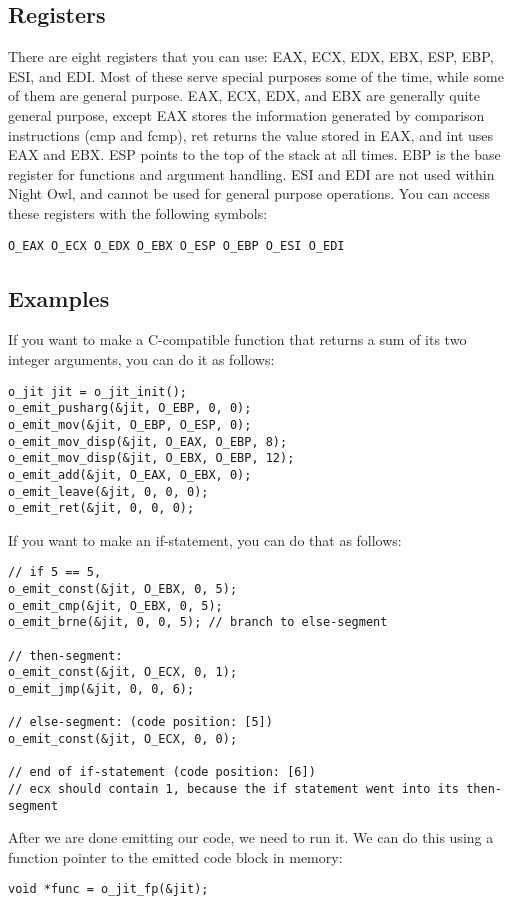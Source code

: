 \documentclass[10pt,a4paper]{article}
\begin{document}
\subsection{Registers}
There are eight registers that you can use: EAX, ECX, EDX, EBX, ESP, EBP, ESI, and EDI. Most of these serve special purposes some of the time, while some of them are general purpose. EAX, ECX, EDX, and EBX are generally quite general purpose, except EAX stores the information generated by comparison instructions (cmp and fcmp), ret returns the value stored in EAX, and int uses EAX and EBX. ESP points to the top of the stack at all times. EBP is the base register for functions and argument handling. ESI and EDI are not used within Night Owl, and cannot be used for general purpose operations. You can access these registers with the following symbols:
\begin{verbatim}
O_EAX O_ECX O_EDX O_EBX O_ESP O_EBP O_ESI O_EDI
\end{verbatim}

\subsection{Examples}
If you want to make a C-compatible function that returns a sum of its two integer arguments, you can do it as follows:
\begin{verbatim}
o_jit jit = o_jit_init();
o_emit_pusharg(&jit, O_EBP, 0, 0);
o_emit_mov(&jit, O_EBP, O_ESP, 0);
o_emit_mov_disp(&jit, O_EAX, O_EBP, 8);
o_emit_mov_disp(&jit, O_EBX, O_EBP, 12);
o_emit_add(&jit, O_EAX, O_EBX, 0);
o_emit_leave(&jit, 0, 0, 0);
o_emit_ret(&jit, 0, 0, 0);
\end{verbatim}

If you want to make an if-statement, you can do that as follows:
\begin{verbatim}
// if 5 == 5,
o_emit_const(&jit, O_EBX, 0, 5);
o_emit_cmp(&jit, O_EBX, 0, 5);
o_emit_brne(&jit, 0, 0, 5); // branch to else-segment

// then-segment:
o_emit_const(&jit, O_ECX, 0, 1);
o_emit_jmp(&jit, 0, 0, 6);

// else-segment: (code position: [5])
o_emit_const(&jit, O_ECX, 0, 0);

// end of if-statement (code position: [6])
// ecx should contain 1, because the if statement went into its then-segment
\end{verbatim}

After we are done emitting our code, we need to run it. We can do this using a function pointer to the emitted code block in memory:
\begin{verbatim}
void *func = o_jit_fp(&jit);
\end{verbatim}
\end{document}
